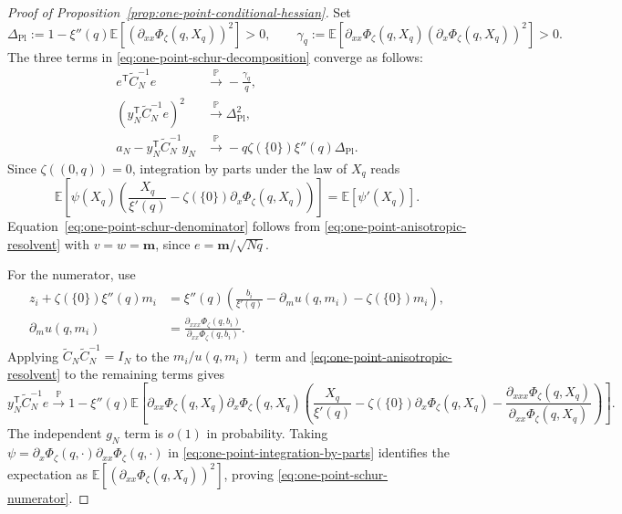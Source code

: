\documentclass[a4paper,10pt,reqno]{amsart}
\numberwithin{equation}{section}
\newcommand{\dP}{\mathbb{P}}%
\newcommand{\dE}{\mathbb{E}}%
\newcommand{\bfm}{\mathbf{m}}
\begin{document}
\begin{proof}[Proof of Proposition~\ref{prop:one-point-conditional-hessian}]
		Set
		\[
		\Delta_{\mathrm{Pl}}:=1-\xi''(q)\dE\left[
		\left(
		\partial_{xx}\Phi_\zeta(q,X_q)
		\right)^2
		\right]>0,
		\qquad
		\gamma_q:=\dE\left[
		\partial_{xx}\Phi_\zeta(q,X_q)
		\left(\partial_x\Phi_\zeta(q,X_q)\right)^2
		\right]>0.
		\]
		The three terms in \eqref{eq:one-point-schur-decomposition} converge as
		follows:
		\begin{align}
			e^{\mathsf T}\widetilde C_N^{-1}e
			&\xrightarrow{\dP}-\frac{\gamma_q}{q},
			\label{eq:one-point-schur-denominator}\\
			\left(y_N^{\mathsf T}\widetilde C_N^{-1}e\right)^2
			&\xrightarrow{\dP}\Delta_{\mathrm{Pl}}^2,
			\label{eq:one-point-schur-numerator}\\
			a_N-y_N^{\mathsf T}\widetilde C_N^{-1}y_N
			&\xrightarrow{\dP}
			-q\zeta(\{0\})\xi''(q)\Delta_{\mathrm{Pl}}.
			\label{eq:one-point-schur-first-term}
		\end{align}
		Since \(\zeta((0,q))=0\), integration by parts under the law of \(X_q\)
		reads
		\begin{equation}\label{eq:one-point-integration-by-parts}
			\dE\left[
			\psi(X_q)\left(
			\frac{X_q}{\xi'(q)}
			-\zeta(\{0\})\partial_x\Phi_\zeta(q,X_q)
			\right)
			\right]
			=\dE[\psi'(X_q)].
		\end{equation}
		Equation~\eqref{eq:one-point-schur-denominator} follows from
		\eqref{eq:one-point-anisotropic-resolvent} with \(v=w=\bfm\), since
		\(e=\bfm/\sqrt{Nq}\).
		
		For the numerator, use
		\[
		\begin{aligned}
			z_i+\zeta(\{0\})\xi''(q)m_i
			&=
			\xi''(q)\left(
			\frac{b_i}{\xi'(q)}
			-\partial_m u(q,m_i)
			-\zeta(\{0\})m_i
			\right),\\
			\partial_m u(q,m_i)
			&=
			\frac{\partial_{xxx}\Phi_\zeta(q,b_i)}
			{\partial_{xx}\Phi_\zeta(q,b_i)}.
		\end{aligned}
		\]
		Applying \(\widetilde C_N\widetilde C_N^{-1}=I_N\) to the
		\(m_i/u(q,m_i)\) term and
		\eqref{eq:one-point-anisotropic-resolvent} to the remaining terms gives
		\[
		y_N^{\mathsf T}\widetilde C_N^{-1}e
		\xrightarrow{\dP}
		1-\xi''(q)\dE\left[
		\partial_{xx}\Phi_\zeta(q,X_q)
		\partial_x\Phi_\zeta(q,X_q)
		\left(
		\frac{X_q}{\xi'(q)}
		-\zeta(\{0\})\partial_x\Phi_\zeta(q,X_q)
		-\frac{\partial_{xxx}\Phi_\zeta(q,X_q)}
		{\partial_{xx}\Phi_\zeta(q,X_q)}
		\right)
		\right].
		\]
		The independent \(g_N\) term is \(o(1)\) in probability.
		Taking
		\(\psi=\partial_x\Phi_\zeta(q,\cdot)
		\partial_{xx}\Phi_\zeta(q,\cdot)\) in
		\eqref{eq:one-point-integration-by-parts} identifies the expectation as
		\(\dE[(\partial_{xx}\Phi_\zeta(q,X_q))^2]\), proving
		\eqref{eq:one-point-schur-numerator}.
		

\end{proof}
\end{document}
